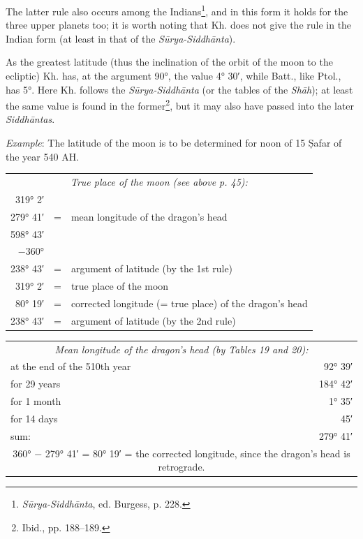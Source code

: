\documentclass[11pt]{article}
\newcommand{\Pg}[1]{\marginpar{\footnotesize\color{gray}#1}}
\begin{document}
\par \Pg{59}The latter rule also occurs among the Indians\footnote{\emph{Sūrya-Siddhānta}, ed. Burgess, p. 228.}, and in this form it holds for the three upper planets too; it is worth noting that Kh. does not give the rule in the Indian form (at least in that of the \emph{Sūrya-Siddhānta}).\par
\par As the greatest latitude (thus the inclination of the orbit of the moon to the ecliptic) Kh. has, at the argument 90°, the value 4° 30′, while Batt., like Ptol., has 5°. Here Kh. follows the \emph{Sūrya-Siddhānta} (or the tables of the \emph{Shāh}); at least the same value is found in the former\footnote{Ibid., pp. 188–189.}, but it may also have passed into the later \emph{Siddhāntas}.\par
\par \emph{Example}: The latitude of the moon is to be determined for noon of 15 Ṣafar of the year 540 AH.\par
\begin{center}\small\begin{tabular}{rcl}
\multicolumn{3}{c}{\emph{True place of the moon (see above p. 45):}} \\
319° 2′\footnotemark{} &  &  \\
279° 41′ & = & mean longitude of the dragon's head \\
598° 43′ &  &  \\
−360° &  &  \\
238° 43′ & = & argument of latitude (by the 1st rule) \\
319° 2′ & = & true place of the moon \\
80° 19′ & = & corrected longitude (= true place) of the dragon's head \\
238° 43′ & = & argument of latitude (by the 2nd rule) \\
\end{tabular}\end{center}
\addtocounter{footnote}{-1}
\begin{center}\small\begin{tabular}{lr}
\multicolumn{2}{c}{\emph{Mean longitude of the dragon's head (by Tables 19 and 20):}} \\
at the end of the 510th year & 92° 39′ \\
for 29 years & 184° 42′ \\
for 1 month & 1° 35′ \\
for 14 days & 45′ \\
sum: & 279° 41′ \\
\multicolumn{2}{c}{360° − 279° 41′ = 80° 19′ = the corrected longitude, since the dragon's head is retrograde.} \\
\end{tabular}\end{center}
\end{document}
